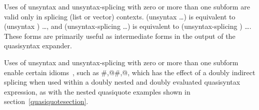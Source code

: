 \begin{entry}{%
}
Uses of {\cf unsyntax} and {\cf unsyntax-splicing} with zero or more than
one subform are valid only in splicing (list or vector) contexts.
{\cf (unsyntax  \dots)} is equivalent to
{\cf (unsyntax ) \dots}, and
{\cf (unsyntax-splicing  \dots)} is equivalent to
{\cf (unsyntax-splicing ) \dots}.
These forms are primarily useful as intermediate forms in the output
of the {\cf quasisyntax} expander.

\begin{note}
Uses of {\cf unsyntax} and {\cf unsyntax-splicing} with 
zero or more than one subform enable certain 
idioms~\cite{bawdenquasiquote}, such as {\cf \#,@\#,@}, which has the
effect of a doubly indirect splicing when used within a doubly nested
and doubly evaluated {\cf quasisyntax} expression, as with the
nested {\cf quasiquote} examples shown in
section~\ref{quasiquotesection}.
\end{note}
\end{entry}

